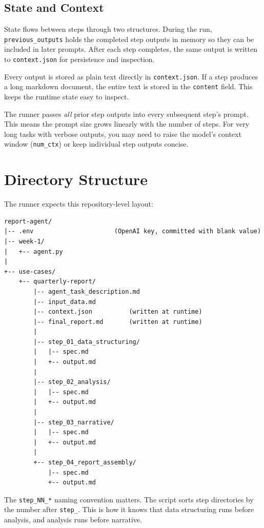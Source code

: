 \documentclass[12pt, a4paper]{article}
\begin{document}
\subsection{State and Context}

State flows between steps through two structures. During the run, \texttt{previous\_outputs} holds the completed step outputs in memory so they can be included in later prompts. After each step completes, the same output is written to \texttt{context.json} for persistence and inspection.

Every output is stored as plain text directly in \texttt{context.json}. If a step produces a long markdown document, the entire text is stored in the \texttt{content} field. This keeps the runtime state easy to inspect.

\begin{warnbox}
The runner passes \textit{all} prior step outputs into every subsequent step's prompt. This means the prompt size grows linearly with the number of steps. For very long tasks with verbose outputs, you may need to raise the model's context window (\texttt{num\_ctx}) or keep individual step outputs concise.
\end{warnbox}

\section{Directory Structure}

The runner expects this repository-level layout:

\begin{lstlisting}[style=plainstyle]
report-agent/
|-- .env                      (OpenAI key, committed with blank value)
|-- week-1/
|   +-- agent.py
|
+-- use-cases/
    +-- quarterly-report/
        |-- agent_task_description.md
        |-- input_data.md
        |-- context.json          (written at runtime)
        |-- final_report.md       (written at runtime)
        |
        |-- step_01_data_structuring/
        |   |-- spec.md
        |   +-- output.md
        |
        |-- step_02_analysis/
        |   |-- spec.md
        |   +-- output.md
        |
        |-- step_03_narrative/
        |   |-- spec.md
        |   +-- output.md
        |
        +-- step_04_report_assembly/
            |-- spec.md
            +-- output.md
\end{lstlisting}

The \texttt{step\_NN\_*} naming convention matters. The script sorts step directories by the number after \texttt{step\_}. This is how it knows that data structuring runs before analysis, and analysis runs before narrative.
\end{document}
